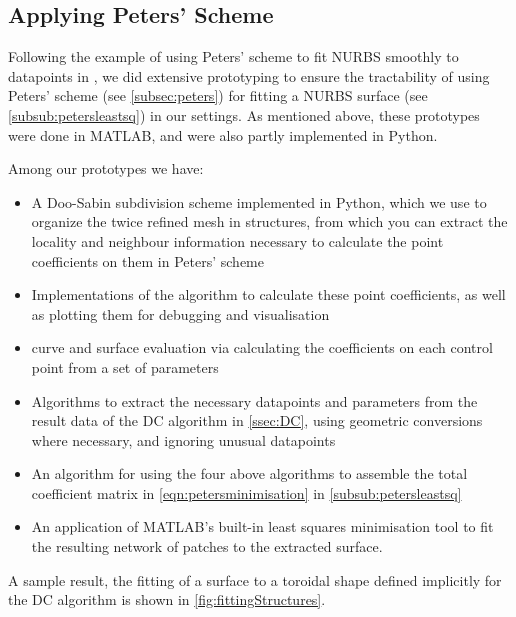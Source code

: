 \subsection{Applying Peters' Scheme}
Following the example of using Peters' scheme to fit NURBS smoothly to datapoints in \cite{eck1996automatic}, we did extensive prototyping to ensure the tractability of using Peters' scheme (see \autoref{subsec:peters}) for fitting a NURBS surface (see \autoref{subsub:petersleastsq}) in our settings. As mentioned above, these prototypes were done in MATLAB, and were also partly implemented in Python. 

Among our prototypes we have:
\begin{itemize}
\item A Doo-Sabin subdivision scheme implemented in Python, which we use to organize the twice refined mesh in structures, from which you can extract the locality and neighbour information necessary to calculate the \Bez point coefficients on them in Peters' scheme
\item Implementations of the algorithm to calculate these \Bez point coefficients, as well as plotting them for debugging and visualisation
\item \Bez curve and surface evaluation via calculating the coefficients on each \Bez control point from a set of parameters
\item Algorithms to extract the necessary datapoints and parameters from the result data of the \acf{DC} algorithm in \autoref{ssec:DC}, using geometric conversions where necessary, and ignoring unusual datapoints
\item An algorithm for using the four above algorithms to assemble the total coefficient matrix in \autoref{eqn:petersminimisation} in \autoref{subsub:petersleastsq}
\item An application of MATLAB's built-in least squares minimisation tool to fit the resulting network of \Bez patches to the extracted surface.
\end{itemize}
A sample result, the fitting of a surface to a toroidal shape defined implicitly for the \acs{DC} algorithm is shown in \autoref{fig:fittingStructures}.


